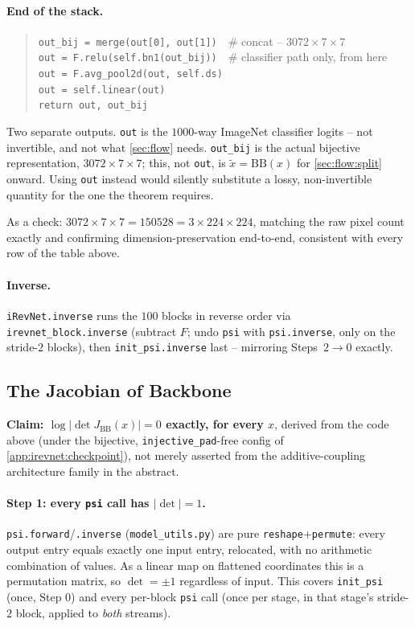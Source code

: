 \paragraph{End of the stack.}
\begin{quote}
\begin{flushleft}
\texttt{out\_bij = merge(out[0], out[1])}\ \ \# concat -- $3072\times7\times7$\\
\texttt{out = F.relu(self.bn1(out\_bij))}\ \ \# classifier path only, from here\\
\texttt{out = F.avg\_pool2d(out, self.ds)}\\
\texttt{out = self.linear(out)}\\
\texttt{return out, out\_bij}
\end{flushleft}
\end{quote}
Two separate outputs. \texttt{out} is the $1000$-way ImageNet classifier logits -- not invertible, and not
what \cref{sec:flow} needs. \texttt{out\_bij} is the actual bijective representation, $3072\times7\times7$;
this, not \texttt{out}, is $\tilde x=\mathrm{BB}(x)$ for \cref{sec:flow:split} onward. Using \texttt{out}
instead would silently substitute a lossy, non-invertible quantity for the one the theorem requires.

As a check: $3072\times7\times7=150528=3\times224\times224$, matching the raw pixel count exactly and
confirming dimension-preservation end-to-end, consistent with every row of the table above.

\paragraph{Inverse.} \texttt{iRevNet.inverse} runs the $100$ blocks in reverse order via
\texttt{irevnet\_block.inverse} (subtract $F$; undo \texttt{psi} with \texttt{psi.inverse}, only on the
stride-$2$ blocks), then \texttt{init\_psi.inverse} last -- mirroring Steps~$2\to0$ exactly.

\subsection{The Jacobian of Backbone}
\label{app:irevnet:jacobian}
\textbf{Claim: $\log|\det J_{\mathrm{BB}}(x)|=0$ exactly, for every $x$}, derived from the code above (under
the bijective, \texttt{injective\_pad}-free config of \cref{app:irevnet:checkpoint}), not merely asserted
from the additive-coupling architecture family in the abstract.

\paragraph{Step 1: every \texttt{psi} call has $|\det|=1$.} \texttt{psi.forward}/\texttt{.inverse}
(\texttt{model\_utils.py}) are pure \texttt{reshape}+\texttt{permute}: every output entry equals exactly one
input entry, relocated, with no arithmetic combination of values. As a linear map on flattened coordinates
this is a permutation matrix, so $\det=\pm1$ regardless of input. This covers \texttt{init\_psi} (once, Step
0) and every per-block \texttt{psi} call (once per stage, in that stage's stride-$2$ block, applied to
\emph{both} streams).

